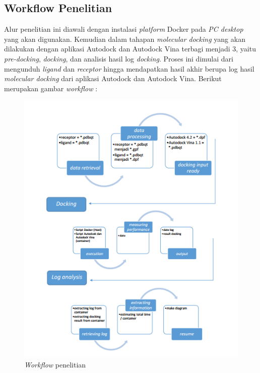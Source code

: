 \subsection{Workflow Penelitian}
\hspace{0.5cm}Alur penelitian ini diawali dengan instalasi \textit{platform} Docker pada \textit{PC desktop} yang akan digunakan. Kemudian dalam tahapan \textit{molecular docking} yang akan dilakukan dengan aplikasi Autodock dan Autodock Vina terbagi menjadi 3, yaitu \textit{pre-docking}, \textit{docking}, dan analisis hasil log \textit{docking}. Proses ini dimulai dari mengunduh \textit{ligand} dan \textit{receptor} hingga mendapatkan hasil akhir berupa log hasil \textit{molecular docking} dari aplikasi Autodock dan Autodock Vina. Berikut merupakan gambar \textit{workflow} :
\begin{figure}
		\centering
		\includegraphics{workflow.PNG}
		\caption{\textit{Workflow} penelitian}
\end{figure} 


